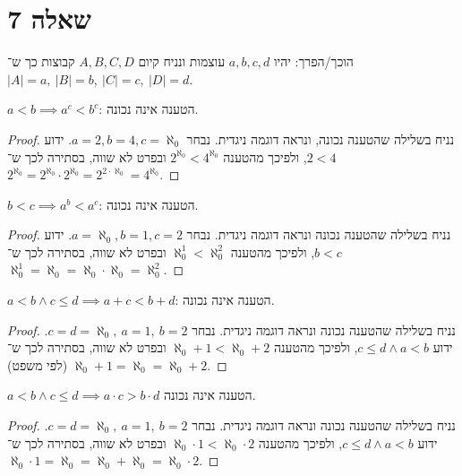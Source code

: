 \documentclass[]{article}
\newcommand\az    {\aleph_0}
\newcommand\taz   {2^{\aleph_0}}
\begin{document}
	\section*{שאלה 7}
	הוכך/הפרך: יהיו $ a, b, c, d $ עוצמות ונניח קיום $ A, B, C, D $ קבוצות כך ש־$ |A| = a, \ |B| = b, \ |C| = c, \ |D| = d $. 
	\begin{hebenum}[(a)]
		\item $ a < b \implies a^c < b^c $: הטענה אינה נכונה. \begin{proof}
			נניח בשלילה שהטענה נכונה, ונראה דוגמה ניגדית. נבחר $ a = 2, b = 4, c = \az $. ידוע $ 2 < 4 $, ולפיכך מהטענה $ 2^{\az} < 4^{\az} $ ובפרט לא שווה, בסתירה לכך ש־$ \taz = \taz \cdot \taz = 2^{2 \cdot \az} = 4^{\az} $. 
		\end{proof}
		\item $ b < c \implies a^b < a^c $: הטענה אינה נכונה. \begin{proof}
			נניח בשלילה שהטענה נכונה ונראה דוגמה ניגדית. נבחר $ a = \az, b = 1, c = 2 $. ידוע $ b < c $, ולפיכך מהטענה $ \az^1 < \az^2 $ ובפרט לא שווה, בסתירה לכך ש־$ \az^1 = \az = \az \cdot \az = \az^2 $. 
		\end{proof}
		\item $ a < b \land c \le d \implies a + c < b + d $: הטענה אינה נכונה. \begin{proof}
			נניח בשלילה שהטענה נכונה ונראה דוגמה ניגדית. נבחר $ c  = d = \az, \ a = 1, \ b = 2 $. ידוע $ c \le d \land a < b $, ולפיכך מהטענה $ \az + 1 < \az + 2 $ ובפרט לא שווה, בסתירה לכך ש־$ \az + 1 = \az = \az + 2 $ (לפי משפט). 
		\end{proof}
		\item $ a < b \land c \le d \implies a \cdot c > b \cdot d $ הטענה אינה נכונה. \begin{proof}
			נניח בשלילה שהטענה נכונה ונראה דוגמה ניגדית. נבחר $ c  = d = \az, \ a = 1, \ b = 2 $. ידוע $ c \le d \land a < b $, ולפיכך מהטענה $ \az \cdot 1 < \az \cdot 2 $ ובפרט לא שווה, בסתירה לכך ש־$ \az \cdot 1 = \az = \az + \az = \az \cdot 2 $. 
		\end{proof}
	\end{hebenum}
\end{document}
